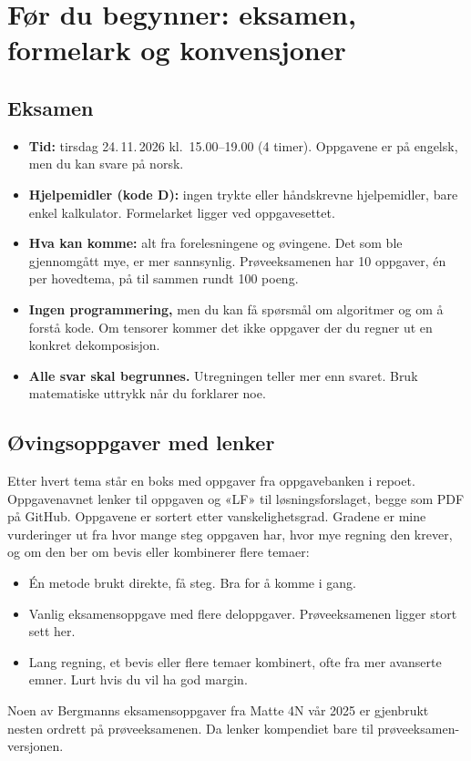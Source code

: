 \section{Før du begynner: eksamen, formelark og konvensjoner}

\subsection{Eksamen}
\begin{itemize}
  \item \textbf{Tid:} tirsdag 24.\,11.\,2026 kl.\ 15.00--19.00 (4 timer). Oppgavene er på engelsk, men du kan svare på norsk.
  \item \textbf{Hjelpemidler (kode D):} ingen trykte eller håndskrevne hjelpemidler, bare enkel kalkulator. Formelarket ligger ved oppgavesettet.
  \item \textbf{Hva kan komme:} alt fra forelesningene og øvingene. Det som ble gjennomgått mye, er mer sannsynlig. Prøveeksamenen har 10 oppgaver, én per hovedtema, på til sammen rundt 100 poeng.
  \item \textbf{Ingen programmering,} men du kan få spørsmål om algoritmer og om å forstå kode. Om tensorer kommer det ikke oppgaver der du regner ut en konkret dekomposisjon.
  \item \textbf{Alle svar skal begrunnes.} Utregningen teller mer enn svaret. Bruk matematiske uttrykk når du forklarer noe.
\end{itemize}

\subsection{Øvingsoppgaver med lenker}
Etter hvert tema står en boks med oppgaver fra oppgavebanken i repoet. Oppgavenavnet lenker til oppgaven og «LF» til løsningsforslaget, begge som PDF på GitHub. Oppgavene er sortert etter vanskelighetsgrad. Gradene er mine vurderinger ut fra hvor mange steg oppgaven har, hvor mye regning den krever, og om den ber om bevis eller kombinerer flere temaer:
\begin{itemize}[leftmargin=5.6em,labelwidth=5em,labelsep=0.6em,align=left]
  \item[\lett] Én metode brukt direkte, få steg. Bra for å komme i gang.
  \item[\middels] Vanlig eksamensoppgave med flere deloppgaver. Prøveeksamenen ligger stort sett her.
  \item[\vanskelig] Lang regning, et bevis eller flere temaer kombinert, ofte fra mer avanserte emner. Lurt hvis du vil ha god margin.
\end{itemize}
Noen av Bergmanns eksamensoppgaver fra Matte 4N vår 2025 er gjenbrukt nesten ordrett på prøveeksamenen. Da lenker kompendiet bare til prøveeksamen-versjonen.

